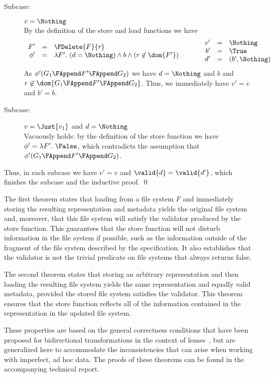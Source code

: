 {\begin{description}
\begin{description}
\item[Subcase:] $v = \Nothing$\\[1ex]
%
By the definition of the store and load functions we have
\[
\begin{array}{rcl}
F' &=& \FDelete{F}{r}\\
\phi' &=& \lambda F'.~(d = \Nothing) \wedge b \wedge (r \not\in \dom{F'})\\
\end{array}\hspace*{1cm}\begin{array}{rcl}
v' &=& \Nothing\\
b' &=& \True\\
d' &=& (b',\Nothing)\\
\end{array}
\]
As $\phi'(G_1 \FAppend F' \FAppend G_2)$ we have $d
= \Nothing$ and $b$ and $r \not\in \dom{G_1 \FAppend F' \FAppend
  G_2}$. Thus, we immediately have $v' = v$ and $b' = b$. 
\item[Subcase:] $v = \Just{v_1}$ and $d = \Nothing$\\[1ex]
%
Vacuously holds: by the definition of the store function we have
$\phi' = \lambda F'.~\False$, which contradicts the assumption that
$\phi'(G_1 \FAppend F' \FAppend G_2)$.
\end{description}
Thus, in each subcase we have $v' = v$ and $\valid{d} = \valid{d'}$,
which finishes the subcase and the inductive proof. \hfill \qed
\end{description}}

\smallskip

\noindent The first theorem states that loading from a file system $F$
and immediately storing the resulting representation and metadata
yields the original file system and, moreover, that this file system
will satisfy the validator produced by the store function. This
guarantees that the store function will not disturb information in the
file system if possible, such as the information outside of the
fragment of the file system described by the specification. It also
establishes that the validator is not the trivial predicate on file
systems that always returns false.

The second theorem states that storing an arbitrary representation 
and then loading the resulting file system yields the same
representation and equally valid metadata,
provided the stored file system satisfies the validator.  
 This theorem ensures that the
store function reflects all of the information contained in the
representation in the updated file system.

These properties are based on the general correctness conditions that
have been proposed for bidirectional transformations in the context of
lenses~\cite{lenses}, but are generalized here to accommodate the
inconsistencies that can arise when working with imperfect, ad hoc
data. The proofs of these theorems can be found in the accompanying
technical report.

